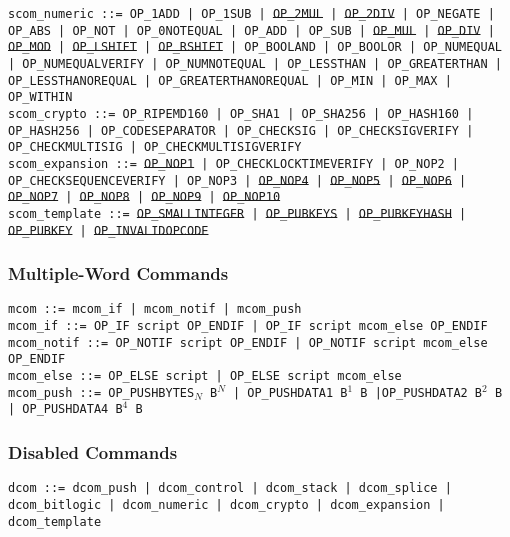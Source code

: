 \documentclass{article}
\begin{document}
\noindent \hangindent=0.7cm
\texttt{scom\_numeric ::=
  OP\_1ADD | OP\_1SUB | \sout{OP\_2MUL} | \sout{OP\_2DIV} | OP\_NEGATE |
  OP\_ABS | OP\_NOT | OP\_0NOTEQUAL | OP\_ADD | OP\_SUB | \sout{OP\_MUL} |
  \sout{OP\_DIV} | \sout{OP\_MOD} | \sout{OP\_LSHIFT} | \sout{OP\_RSHIFT} |
  OP\_BOOLAND | OP\_BOOLOR | OP\_NUMEQUAL | OP\_NUMEQUALVERIFY |
  OP\_NUMNOTEQUAL | OP\_LESSTHAN | OP\_GREATERTHAN | OP\_LESSTHANOREQUAL |
  OP\_GREATERTHANOREQUAL | OP\_MIN | OP\_MAX | OP\_WITHIN} \\

\noindent \hangindent=0.7cm
\texttt{scom\_crypto ::=
  OP\_RIPEMD160 | OP\_SHA1 | OP\_SHA256 | OP\_HASH160 | OP\_HASH256 |
  OP\_CODESEPARATOR | OP\_CHECKSIG | OP\_CHECKSIGVERIFY | OP\_CHECKMULTISIG |
  OP\_CHECKMULTISIGVERIFY} \\

\noindent \hangindent=0.7cm
\texttt{scom\_expansion ::=
  \sout{OP\_NOP1} | OP\_CHECKLOCKTIMEVERIFY | OP\_NOP2 |
  OP\_CHECKSEQUENCEVERIFY | OP\_NOP3 | \sout{OP\_NOP4} | \sout{OP\_NOP5} |
  \sout{OP\_NOP6} | \sout{OP\_NOP7} | \sout{OP\_NOP8} | \sout{OP\_NOP9} |
  \sout{OP\_NOP10}} \\

\noindent \hangindent=0.7cm
\texttt{scom\_template ::=
  \sout{OP\_SMALLINTEGER} | \sout{OP\_PUBKEYS} | \sout{OP\_PUBKEYHASH} |
  \sout{OP\_PUBKEY} | \sout{OP\_INVALIDOPCODE}}

\subsubsection{Multiple-Word Commands}
\noindent \hangindent=0.7cm
\texttt{mcom ::= mcom\_if | mcom\_notif | mcom\_push} \\

\noindent
\texttt{mcom\_if ::= OP\_IF script OP\_ENDIF | OP\_IF script mcom\_else OP\_ENDIF} \\
\texttt{mcom\_notif ::= OP\_NOTIF script OP\_ENDIF | OP\_NOTIF script mcom\_else OP\_ENDIF} \\
\texttt{mcom\_else ::= OP\_ELSE script | OP\_ELSE script mcom\_else } \\

\noindent \hangindent=0.7cm
\texttt{mcom\_push ::=
  OP\_PUSHBYTES$_N$ B$^N$ | OP\_PUSHDATA1 B$^1$ B |OP\_PUSHDATA2 B$^2$ B
  | OP\_PUSHDATA4 B$^4$ B}
  
\subsubsection{Disabled Commands}
\noindent \hangindent=0.7cm
\texttt{dcom ::=
  dcom\_push | dcom\_control | dcom\_stack | dcom\_splice | dcom\_bitlogic |
  dcom\_numeric | dcom\_crypto | dcom\_expansion | dcom\_template} \\
\end{document}
